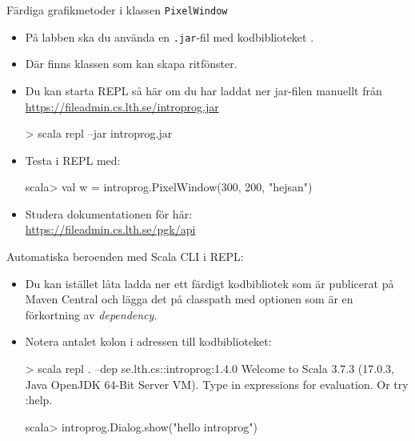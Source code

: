 \begin{Slide}{Färdiga grafikmetoder i klassen \texttt{PixelWindow}}\SlideFontSmall

\begin{itemize}
\item På labben ska du använda en \texttt{.jar}-fil med kodbiblioteket .
\item Där finns klassen  som kan skapa ritfönster.
\item Du kan starta REPL så här om du har laddat ner jar-filen manuellt från\\\url{https://fileadmin.cs.lth.se/introprog.jar}  %
\begin{REPLnonum}
> scala repl --jar introprog.jar 
\end{REPLnonum}
\item Testa  i REPL med:
\begin{REPLnonum}
scala> val w = introprog.PixelWindow(300, 200, "hejsan")
\end{REPLnonum}
\item Studera dokumentationen för  här: \\\url{https://fileadmin.cs.lth.se/pgk/api}
\end{itemize}
\end{Slide}


\begin{Slide}{Automatiska beroenden med Scala CLI i REPL:}
\begin{itemize}\SlideFontSmall
\item Du kan istället låta   ladda ner ett färdigt kodbibliotek som är publicerat på Maven Central och lägga det på classpath med optionen  som är en förkortning av \emph{dependency}. 
\item Notera antalet kolon i adressen till kodbiblioteket:
\begin{REPLsmall}
> scala repl . --dep se.lth.cs::introprog:1.4.0
Welcome to Scala 3.7.3 (17.0.3, Java OpenJDK 64-Bit Server VM).
Type in expressions for evaluation. Or try :help.

scala> introprog.Dialog.show("hello introprog")
\end{REPLsmall}
\end{itemize}
\end{Slide}


